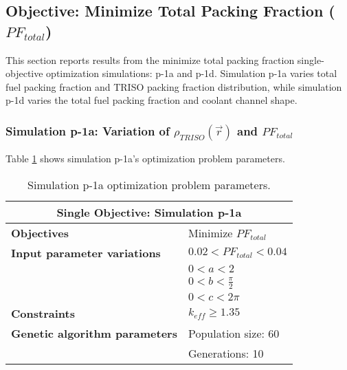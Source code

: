 \subsection{Objective: Minimize Total Packing Fraction ($PF_{total}$)}
This section reports results from the minimize total packing fraction single-objective
optimization simulations: p-1a and p-1d. 
Simulation p-1a varies total fuel packing fraction and \gls{TRISO} packing fraction 
distribution, while simulation p-1d varies the total fuel packing fraction and 
coolant channel shape. 

\subsubsection{Simulation p-1a: Variation of $\rho_{TRISO}(\vec{r})$ and $PF_{total}$}
Table \ref{tab:simulationp1a} shows simulation p-1a's optimization problem parameters. 
\begin{table}[htbp!]
    \centering
    \onehalfspacing
    \caption{Simulation p-1a optimization problem parameters.}
	\label{tab:simulationp1a}
    \footnotesize
    \begin{tabular}{l|p{5cm}}
    \hline 
    \multicolumn{2}{c}{\textbf{Single Objective: Simulation p-1a}} \\
    \hline 
    \textbf{Objectives} & Minimize $PF_{total}$ \\
    \hline 
    \textbf{Input parameter variations} & $0.02<PF_{total}<0.04$ \\
    & $0<a<2$ \\
    & $0<b<\frac{\pi}{2}$ \\
    & $0<c<2\pi$ \\
    \hline
    \textbf{Constraints} & $k_{eff} \geq 1.35$\\ 
    \hline 
    \textbf{Genetic algorithm parameters} & Population size: 60 \\
    & Generations: 10 \\
    \hline
    \end{tabular}
\end{table}

